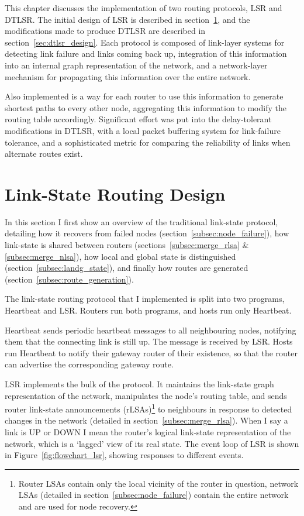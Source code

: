 \documentclass[withindex,glossary,openany]{cam-thesis}
\begin{document}
This chapter discusses the implementation of two routing protocols, LSR and DTLSR. The initial design of LSR is described in section~\ref{sec:lsr_design}, and the modifications made to produce DTLSR are described in section~\ref{sec:dtlsr_design}. Each protocol is composed of link-layer systems for detecting link failure and links coming back up, integration of this information into an internal graph representation of the network, and a network-layer mechanism for propagating this information over the entire network.

Also implemented is a way for each router to use this information to generate shortest paths to every other node, aggregating this information to modify the routing table accordingly. Significant effort was put into the delay-tolerant modifications in DTLSR, with a local packet buffering system for link-failure tolerance, and a sophisticated metric for comparing the reliability of links when alternate routes exist.

\section{Link-State Routing Design}
\label{sec:lsr_design}

In this section I first show an overview of the traditional link-state protocol, detailing how it recovers from failed nodes (section~\ref{subsec:node_failure}), how link-state is shared between routers (sections~\ref{subsec:merge_rlsa} \& \ref{subsec:merge_nlsa}), how local and global state is distinguished (section~\ref{subsec:landg_state}), and finally how routes are generated (section~\ref{subsec:route_generation}).

The link-state routing protocol that I implemented is split into two programs, Heartbeat and LSR.  Routers run both programs, and hosts run only Heartbeat.

Heartbeat sends periodic heartbeat messages to all neighbouring nodes, notifying them that the connecting link is still up. The message is received by LSR. Hosts run Heartbeat to notify their gateway router of their existence, so that the router can advertise the corresponding gateway route.

LSR implements the bulk of the protocol. It maintains the link-state graph representation of the network, manipulates the node's routing table, and sends router link-state announcements (rLSAs)\footnote{Router LSAs contain only the local vicinity of the router in question, network LSAs (detailed in section~\ref{subsec:node_failure}) contain the entire network and are used for node recovery.} to neighbours in response to detected changes in the network (detailed in section~\ref{subsec:merge_rlsa}). When I say a link is UP or DOWN I mean the router's logical link-state representation of the network, which is a `lagged' view of its real state. The event loop of LSR is shown in Figure~\ref{fig:flowchart_lsr}, showing responses to different events.
\end{document}
